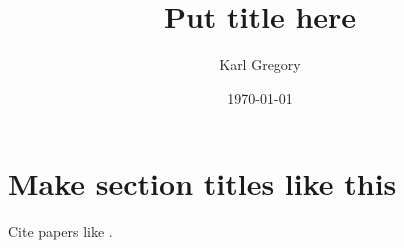 \documentclass[11pt]{article}
\title{Put title here}
\author{Karl Gregory}
\date{\today}
\begin{document}
\maketitle

\section*{Make section titles like this}

Cite papers like \cite{efron2004least}.





\end{document}

